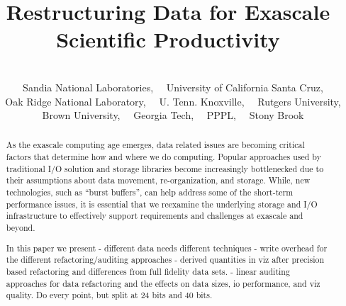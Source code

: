 \documentclass{sig-alt-gov2}
\begin{document}

\title{Restructuring Data for Exascale Scientific Productivity}

\author{
\\
\footnotemark[1]~~Sandia National Laboratories,
\footnotemark[2]~~University of California Santa Cruz,\\
\footnotemark[3]~~Oak Ridge National Laboratory,
\footnotemark[4]~~U. Tenn. Knoxville,
\footnotemark[5]~~Rutgers University,\\
\footnotemark[6]~~Brown University,
\footnotemark[7]~~Georgia Tech,
\footnotemark[8]~~PPPL,
\footnotemark[9]~~Stony Brook
}
\maketitle

\begin{abstract}

As the exascale computing age emerges, data related issues are becoming
critical factors that determine how and where we do computing. Popular
approaches used by traditional I/O solution and storage libraries become
increasingly bottlenecked due to their assumptions about data movement,
re-organization, and storage. While, new technologies, such as ``burst
buffers'', can help address some of the short-term performance issues, it is
essential that we reexamine the underlying storage and I/O infrastructure to
effectively support requirements and challenges at exascale and beyond.

In this paper we present
- different data needs different techniques
- write overhead for the different refactoring/auditing approaches
- derived quantities in viz after precision based refactoring and differences
  from full fidelity data sets.
- linear auditing approaches for data refactoring and the effects on data
  sizes, io performance, and viz quality. Do every point, but split at 24 bits
and 40 bits.

\end{abstract}
\end{document}
